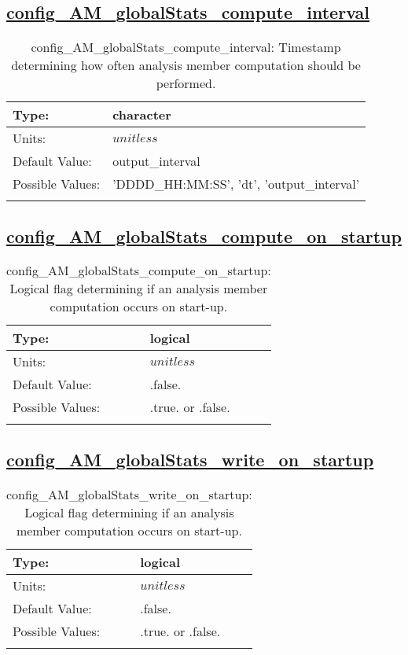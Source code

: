 \subsection[config\_AM\_globalStats\_compute\_interval]{\hyperref[sec:nm_tab_AM_globalStats]{config\_AM\_globalStats\_compute\_interval}}
\label{subsec:nm_sec_config_AM_globalStats_compute_interval}
\begin{center}
\begin{longtable}{| p{2.0in} || p{4.0in} |}
    \hline
    Type: & character \\
    \hline
    Units: & $unitless$ \\
    \hline
    Default Value: & output\_interval \\
    \hline
    Possible Values: & 'DDDD\_HH:MM:SS', 'dt', 'output\_interval' \\
    \hline
    \caption{config\_AM\_globalStats\_compute\_interval: Timestamp determining how often analysis member computation should be performed.}
\end{longtable}
\end{center}
\subsection[config\_AM\_globalStats\_compute\_on\_startup]{\hyperref[sec:nm_tab_AM_globalStats]{config\_AM\_globalStats\_compute\_on\_startup}}
\label{subsec:nm_sec_config_AM_globalStats_compute_on_startup}
\begin{center}
\begin{longtable}{| p{2.0in} || p{4.0in} |}
    \hline
    Type: & logical \\
    \hline
    Units: & $unitless$ \\
    \hline
    Default Value: & .false. \\
    \hline
    Possible Values: & .true. or .false. \\
    \hline
    \caption{config\_AM\_globalStats\_compute\_on\_startup: Logical flag determining if an analysis member computation occurs on start-up.}
\end{longtable}
\end{center}
\subsection[config\_AM\_globalStats\_write\_on\_startup]{\hyperref[sec:nm_tab_AM_globalStats]{config\_AM\_globalStats\_write\_on\_startup}}
\label{subsec:nm_sec_config_AM_globalStats_write_on_startup}
\begin{center}
\begin{longtable}{| p{2.0in} || p{4.0in} |}
    \hline
    Type: & logical \\
    \hline
    Units: & $unitless$ \\
    \hline
    Default Value: & .false. \\
    \hline
    Possible Values: & .true. or .false. \\
    \hline
    \caption{config\_AM\_globalStats\_write\_on\_startup: Logical flag determining if an analysis member computation occurs on start-up.}
\end{longtable}
\end{center}
